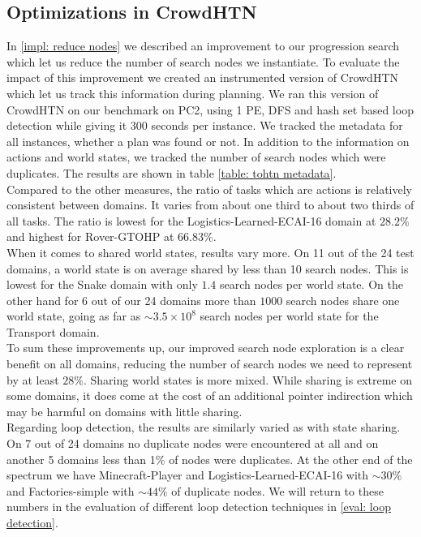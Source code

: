 \subsection{Optimizations in CrowdHTN}
\label{eval: crowd optimizations}
In \ref{impl: reduce nodes} we described an improvement to our progression search which let us reduce the number of search nodes we instantiate. To evaluate the impact of this improvement we created an instrumented version of CrowdHTN which let us track this information during planning. We ran this version of CrowdHTN on our benchmark on PC2, using 1 PE, DFS and hash set based loop detection while giving it 300 seconds per instance. We tracked the metadata for all instances, whether a plan was found or not. In addition to the information on actions and world states, we tracked the number of search nodes which were duplicates. The results are shown in table \ref{table: tohtn metadata}. \\
Compared to the other measures, the ratio of tasks which are actions is relatively consistent between domains. It varies from about one third to about two thirds of all tasks. The ratio is lowest for the Logistics-Learned-ECAI-16 domain at $28.2\%$ and highest for Rover-GTOHP at $66.83\%$. \\
When it comes to shared world states, results vary more. On 11 out of the 24 test domains, a world state is on average shared by less than 10 search nodes. This is lowest for the Snake domain with only $1.4$ search nodes per world state. On the other hand for 6 out of our 24 domains more than $1000$ search nodes share one world state, going as far as $\sim3.5 \times 10^8$ search nodes per world state for the Transport domain. \\
To sum these improvements up, our improved search node exploration is a clear benefit on all domains, reducing the number of search nodes we need to represent by at least $28\%$. Sharing world states is more mixed. While sharing is extreme on some domains, it does come at the cost of an additional pointer indirection which may be harmful on domains with little sharing. \\
Regarding loop detection, the results are similarly varied as with state sharing. On 7 out of 24 domains no duplicate nodes were encountered at all and on another 5 domains less than 1\% of nodes were duplicates. At the other end of the spectrum we have Minecraft-Player and Logistics-Learned-ECAI-16 with $\sim30\%$ and Factories-simple with $\sim44\%$ of duplicate nodes. We will return to these numbers in the evaluation of different loop detection techniques in \ref{eval: loop detection}.
